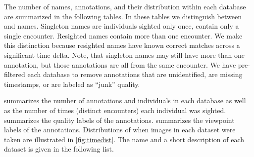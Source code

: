         \DatabaseInfo{}

        \timedist{}

        The number of names, annotations, and their distribution within each database are summarized in the
          following tables.
        In these tables we distinguish between  and  names.
        Singleton names are individuals sighted only once, \ie{} contain only a single encounter.
        Resighted names contain more than one encounter.
        We make this distinction because resighted names have known correct matches across a significant time
          delta.
        Note, that singleton names may still have more than one annotation, but those annotations are all from
          the same encounter.
        We have pre-filtered each database to remove annotations that are unidentified, are missing timestamps,
          or are labeled as ``junk'' quality.

         summarizes the number of annotations and individuals in each database as
          well as the number of times (distinct encounters) each individual was sighted.
         summarizes the quality labels of the annotations.
         summarizes the viewpoint labels of the annotations.
        Distributions of when images in each dataset were taken are illustrated in \cref{fig:timedist}.
        The name and a short description of each dataset is given in the following list.

